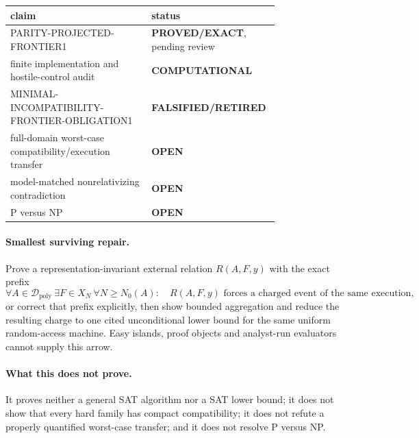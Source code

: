 \documentclass[11pt]{article}
\newcommand{\OPEN}{\textbf{OPEN}}
\newcommand{\proved}{\textbf{PROVED/EXACT}}
\newcommand{\comp}{\textbf{COMPUTATIONAL}}
\newcommand{\retired}{\textbf{FALSIFIED/RETIRED}}
\begin{document}
\begin{center}
\begin{tabular}{p{0.50\linewidth}p{0.28\linewidth}}
\toprule
claim & status\\
\midrule
PARITY-PROJECTED-FRONTIER1 & \proved, pending review\\
finite implementation and hostile-control audit & \comp\\
MINIMAL-INCOMPATIBILITY-FRONTIER-OBLIGATION1 & \retired\\
full-domain worst-case compatibility/execution transfer & \OPEN\\
model-matched nonrelativizing contradiction & \OPEN\\
P versus NP & \OPEN\\
\bottomrule
\end{tabular}
\end{center}

\paragraph{Smallest surviving repair.}
Prove a representation-invariant external relation $R(A,F,y)$ with the exact
prefix
\[
\forall A\in\mathcal D_{\mathrm{poly}}\ \exists F\in X_N\ \forall N\ge N_0(A):
\quad R(A,F,y)\text{ forces a charged event of the same execution},
\]
or correct that prefix explicitly, then show bounded aggregation and reduce the
resulting charge to one cited unconditional lower bound for the same uniform
random-access machine.  Easy islands, proof objects and analyst-run evaluators
cannot supply this arrow.

\paragraph{What this does not prove.}
It proves neither a general SAT algorithm nor a SAT lower bound; it does not
show that every hard family has compact compatibility; it does not refute a
properly quantified worst-case transfer; and it does not resolve P versus NP.
\end{document}
